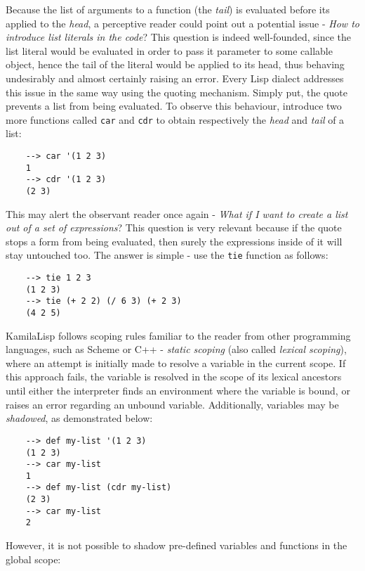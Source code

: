 Because the list of arguments to a function (the \textit{tail}) is evaluated before its applied to the \textit{head}, a perceptive reader could point out a potential issue - \textit{How to introduce list literals in the code}? This question is indeed well-founded, since the list literal would be evaluated in order to pass it parameter to some callable object, hence the tail of the literal would be applied to its head, thus behaving undesirably and almost certainly raising an error. Every Lisp dialect addresses this issue in the same way using the quoting mechanism. Simply put, the quote prevents a list from being evaluated. To observe this behaviour, introduce two more functions called \verb|car| and \verb|cdr| to obtain respectively the \textit{head} and \textit{tail} of a list:

\begin{Verbatim}
    --> car '(1 2 3)
    1
    --> cdr '(1 2 3)
    (2 3)
\end{Verbatim}

This may alert the observant reader once again - \textit{What if I want to create a list out of a set of expressions}? This question is very relevant because if the quote stops a form from being evaluated, then surely the expressions inside of it will stay untouched too. The answer is simple - use the \verb|tie| function as follows:

\begin{Verbatim}
    --> tie 1 2 3
    (1 2 3)
    --> tie (+ 2 2) (/ 6 3) (+ 2 3)
    (4 2 5)
\end{Verbatim}

KamilaLisp follows scoping rules familiar to the reader from other programming languages, such as Scheme or C++ - \textit{static scoping} (also called \textit{lexical scoping}), where an attempt is initially made to resolve a variable in the current scope. If this approach fails, the variable is resolved in the scope of its lexical ancestors until either the interpreter finds an environment where the variable is bound, or raises an error regarding an unbound variable. Additionally, variables may be \textit{shadowed}, as demonstrated below:

\begin{Verbatim}
    --> def my-list '(1 2 3)
    (1 2 3)
    --> car my-list
    1
    --> def my-list (cdr my-list)
    (2 3)
    --> car my-list
    2
\end{Verbatim}

However, it is not possible to shadow pre-defined variables and functions in the global scope:

